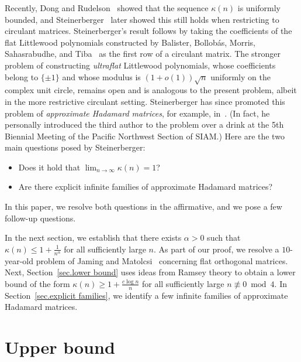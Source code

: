 \documentclass[11pt]{article}
\theoremstyle{plain}
\theoremstyle{definition}
\begin{document}
Recently, Dong and Rudelson~\cite{DongR:24} showed that the sequence $\kappa(n)$ is uniformly bounded, and Steinerberger~\cite{Steinerberger:24} later showed this still holds when restricting to circulant matrices.
Steinerberger's result follows by taking the coefficients of the flat Littlewood polynomials constructed by Balister, Bollob\'as, Morris, Sahasrabudhe, and Tiba~\cite{BalisterBMST:20} as the first row of a circulant matrix. The stronger problem of constructing \emph{ultraflat} Littlewood polynomials, whose coefficients belong to \(\{\pm1\}\) and whose modulus is \((1+o(1))\sqrt{n}\) uniformly on the complex unit circle, remains open and is analogous to the present problem, albeit in the more restrictive circulant setting.
Steinerberger has since promoted this problem of \textit{approximate Hadamard matrices}, for example, in~\cite{Manskova:25,Steinerberger:notes}.
(In fact, he personally introduced the third author to the problem over a drink at the 5th Biennial Meeting of the Pacific Northwest Section of SIAM.)
Here are the two main questions posed by Steinerberger:
\begin{itemize}
\item[1.] Does it hold that $\displaystyle\lim_{n\to\infty}\kappa(n)=1$?
\item[2.] Are there explicit infinite families of approximate Hadamard matrices?
\end{itemize}
In this paper, we resolve both questions in the affirmative, and we pose a few follow-up questions.

In the next section, we establish that there exists $\alpha>0$ such that $ \kappa(n)\leq1+\frac{1}{n^\alpha}$ for all sufficiently large $n$.
As part of our proof, we resolve a $10$-year-old problem of Jaming and Matolcsi~\cite{JamingM:15} concerning flat orthogonal matrices.
Next, Section~\ref{sec.lower bound} uses ideas from Ramsey theory to obtain a lower bound of the form $\kappa(n)\geq 1+\frac{c\log n}{n}$ for all sufficiently large $n\not\equiv 0\bmod 4$.
In Section~\ref{sec.explicit families}, we identify a few infinite families of approximate Hadamard matrices.


\section{Upper bound}
\end{document}
